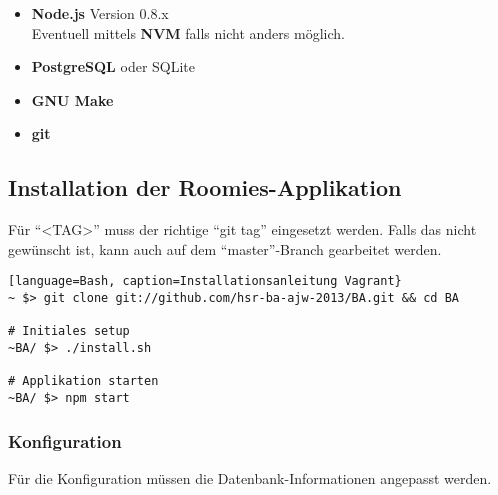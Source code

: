 \begin{itemize}
	\item \textbf{Node.js} Version 0.8.x \cite{nodejs}\\
		Eventuell mittels \textbf{NVM} \cite{NVM} falls nicht anders möglich.
	\item \textbf{PostgreSQL} \cite{PostgreSQL} oder SQLite \cite{SQLite}
	\item \textbf{GNU Make} \cite{GNUmake}
	\item \textbf{git} \cite{git}
\end{itemize}

\subsection*{Installation der Roomies-Applikation}

Für ``<TAG>'' muss der richtige ``git tag'' eingesetzt werden. Falls das nicht gewünscht ist, kann auch auf dem ``master''-Branch gearbeitet werden.

\begin{lstlisting}[language=Bash, caption=Installationsanleitung Vagrant}
~ $> git clone git://github.com/hsr-ba-ajw-2013/BA.git && cd BA

# Initiales setup
~BA/ $> ./install.sh

# Applikation starten
~BA/ $> npm start
\end{lstlisting}

\subsubsection*{Konfiguration}
Für die Konfiguration müssen die Datenbank-Informationen angepasst werden.